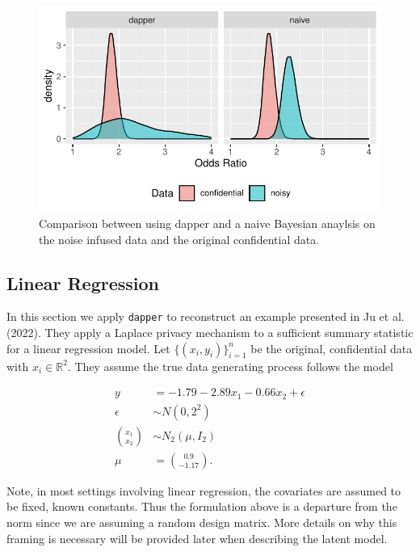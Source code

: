\begin{figure}

{\centering \includegraphics{dppaper_files/figure-latex/post-or-compare-1} 

}

\caption{Comparison between using dapper and a naive Bayesian anaylsis on the
noise infused data and the original confidential data.}\label{fig:post-or-compare}
\end{figure}

\hypertarget{linear-regression}{%
\subsection{Linear Regression}\label{linear-regression}}

In this section we apply \texttt{dapper} to reconstruct an
example presented in Ju et al. (2022). They apply a Laplace privacy
mechanism to a sufficient summary statistic for a linear regression model.
Let \(\{(x_i,y_i)\}_{i=1}^{n}\) be the original, confidential data with \(x_i \in \mathbb{R}^2\).
They assume the true data generating process follows the model

\[
\begin{aligned}
y &= -1.79 -2.89x_1 -0.66x_2 + \epsilon\\
\epsilon &\sim N(0,2^2)\\
\binom{x_1}{x_2} &\sim N_{2}(\mu, I_2)\\
\mu &= \binom{0.9}{-1.17}.
\end{aligned}
\]

Note, in most settings involving linear regression, the covariates are assumed to be
fixed, known constants. Thus the formulation above is a departure from the norm since
we are assuming a random design matrix. More details on why this framing is necessary
will be provided later when describing the latent model.

